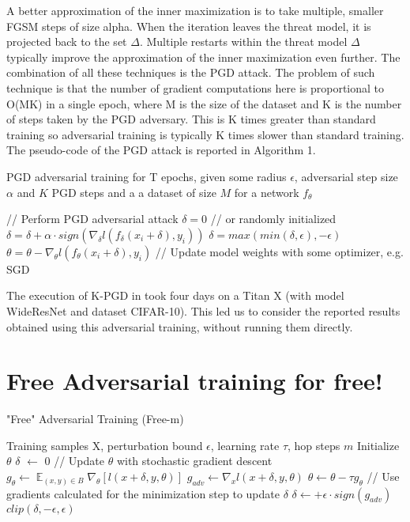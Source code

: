 \documentclass{article}
\DeclareMathOperator{\EX}{\mathbb{E}}%
\begin{document}
A better approximation of the inner maximization is to take multiple, smaller FGSM steps of size alpha. When the iteration leaves the threat model, it is projected back to the set $\Delta$. Multiple restarts within the threat model $\Delta$ typically improve the approximation of the inner maximization even further. The combination of all these techniques is the PGD attack. The problem of such technique is that the number of gradient computations here is proportional to O(MK) in a single epoch, where M is the size of the dataset and K is the number of steps taken by the PGD adversary. This is K times greater than standard training so adversarial training is typically K times slower than standard training. The pseudo-code of the PGD attack is reported in Algorithm 1.
\begin{algorithm}[H]
	\caption{PGD adversarial training for T epochs, given some radius $\epsilon$, adversarial step size $\alpha$ and $K$ PGD steps and a a dataset of size $M$ for a network $f_{\theta}$}
	\begin{algorithmic}[1]
		\State// Perform PGD adversarial attack
		\State $\delta = 0$ // or randomly initialized
		\State $\delta = \delta + \alpha\cdot sign(\nabla_{\delta}l(f_{\delta}(x_i + \delta), y_i))$
		\State $\delta = max(min(\delta, \epsilon), -\epsilon)$
		\EndFor
		\State$\theta = \theta - \nabla_{\theta}l(f_{\theta}(x_i + \delta), y_i)$ // Update model weights with some optimizer, e.g. SGD
		\EndFor
		\EndFor
	\end{algorithmic}
\end{algorithm}
The execution of K-PGD in \cite{MadryEtAl2017} took four days on a Titan X (with model WideResNet and dataset CIFAR-10). This led us to consider the reported results obtained using this adversarial training, without running them directly.


\section{Free Adversarial training for free!}

\begin{algorithm}[H]
	\caption{"Free" Adversarial Training (Free-m)}
	\begin{algorithmic}[1]
		\Require Training samples X, perturbation bound $\epsilon$, learning rate $\tau$, hop steps $m$
		\State Initialize $\theta$
		\State $\delta$ $\leftarrow$ 0
		\State // Update $\theta$ with stochastic gradient descent
		\State $g_{\theta} \leftarrow \EX_{(x,y) \in B} \nabla_{\theta} [l(x+\delta, y, \theta)]$
		\State $g_{adv} \leftarrow \nabla_{x} l(x+\delta, y, \theta)$
		\State $\theta \leftarrow \theta - \tau g_{\theta}$
		\State // Use gradients calculated for the minimization step to update $\delta$
		\State $\delta \leftarrow + \epsilon \cdot sign(g_{adv})$
		\State $clip(\delta, -\epsilon, \epsilon)$
		\EndFor
		\EndFor
		\EndFor
	\end{algorithmic}
\end{algorithm}
\end{document}
